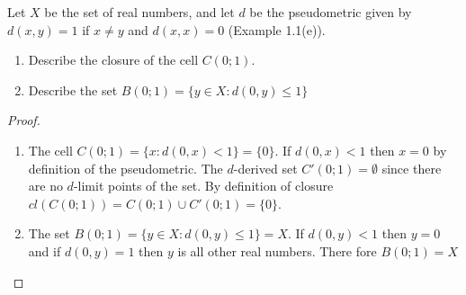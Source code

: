 \setcounter{question}{9}  %
\begin{question}[Fernandez]
  Let $X$ be the set of real numbers, and let $d$ be the pseudometric given by $d(x,y)=1$ if $x\neq y$ and $d(x,x)=0$ (Example 1.1(e)).
  \begin{enumerate}
      \item Describe the closure of the cell $C(0;1)$.
      \item Describe the set $B(0;1)=\{y\in X:d(0,y)\leq1\}$
  \end{enumerate}
\end{question}
    
\begin{proof}
  \begin{enumerate}
        \item The cell $C(0;1)=\{x:d(0,x)<1\}=\{0\}$. If $d(0,x)<1$ then $x=0$ by definition of the pseudometric. The $d$-derived set $C'(0;1)=\emptyset$ since there are no $d$-limit points of the set. By definition of closure $cl(C(0;1))=C(0;1)\cup C'(0;1)=\{0\}$.
        \item The set $B(0;1)=\{y\in X:d(0,y)\leq1\}=X$. If $d(0,y)<1$ then $y=0$ and if $d(0,y)=1$ then $y$ is all other real numbers. There fore $B(0;1)=X$
    \end{enumerate}
\end{proof}

